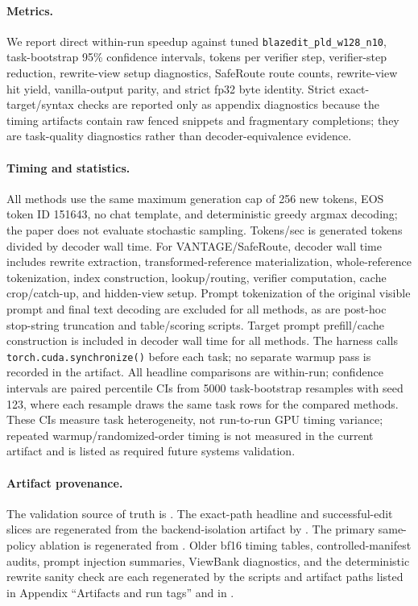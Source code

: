 \documentclass[11pt,a4paper]{article}
\begin{document}
\paragraph{Metrics.}
We report direct within-run speedup against tuned
\texttt{blazedit\_pld\_w128\_n10}, task-bootstrap 95\% confidence
intervals, tokens per verifier step, verifier-step reduction,
rewrite-view setup diagnostics, SafeRoute route counts, rewrite-view hit
yield, vanilla-output parity, and strict
fp32 byte identity. Strict exact-target/syntax checks are reported only as
appendix diagnostics because the timing artifacts contain raw fenced snippets
and fragmentary completions; they are task-quality diagnostics rather than
decoder-equivalence evidence.

\paragraph{Timing and statistics.}
All methods use the same maximum generation cap of 256 new tokens,
EOS token ID 151643, no chat template, and deterministic greedy
argmax decoding; the paper does not evaluate stochastic sampling.
Tokens/sec is generated tokens divided by decoder wall time. For
VANTAGE/SafeRoute, decoder wall time includes rewrite extraction,
transformed-reference materialization, whole-reference tokenization, index
construction, lookup/routing, verifier computation, cache
crop/catch-up, and hidden-view setup. Prompt tokenization of the original
visible prompt and final text decoding are excluded for all methods, as are
post-hoc stop-string truncation and table/scoring scripts. Target prompt
prefill/cache construction is included in decoder wall time for all methods.
The harness calls \texttt{torch.cuda.synchronize()} before
each task; no separate warmup pass is recorded in the artifact. All
headline comparisons are within-run; confidence intervals are paired
percentile CIs from 5000 task-bootstrap resamples with seed 123, where
each resample draws the same task rows for the compared methods. These CIs
measure task heterogeneity, not run-to-run GPU timing variance; repeated
warmup/randomized-order timing is not measured in the current artifact and is
listed as required future systems validation.

\paragraph{Artifact provenance.}
The validation source of truth is
. The exact-path
headline and successful-edit slices are regenerated from the backend-isolation
artifact by . The
primary same-policy ablation is regenerated from
.
Older bf16 timing tables, controlled-manifest audits, prompt injection
summaries, ViewBank diagnostics, and the deterministic rewrite sanity check are
each regenerated by the scripts and artifact paths listed in
Appendix ``Artifacts and run tags'' and in
.
\end{document}
